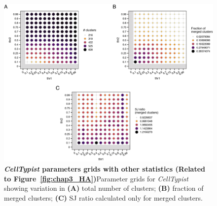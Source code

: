 \begin{figure}[ht!] 
\centering    
\includegraphics[width=1.0\textwidth]{Appendix2/Figs/chap4_grids.png} %
\caption[\textit{CellTypist} parameters grids with other statistics]{\textbf{\textit{CellTypist} parameters grids with other statistics (Related to Figure~\ref{fig:chap3_HA})}\newline Parameter grids for \textit{CellTypist} showing variation in \textbf{(A)} total number of clusters; \textbf{(B)} fraction of merged clusters; \textbf{(C)} SJ ratio calculated only for merged clusters.}
\label{fig:appB_grids}
\end{figure}


